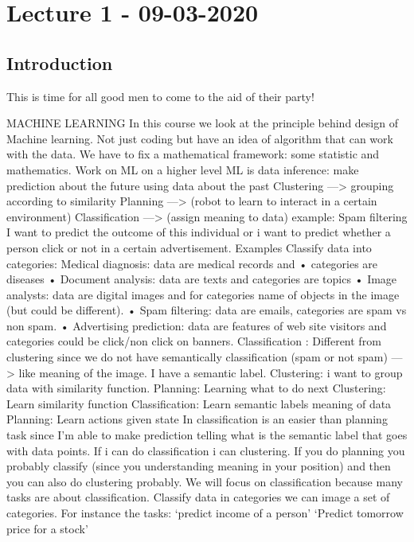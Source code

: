 \documentclass[../main.tex]{subfiles}
\begin{document}
\chapter{Lecture 1 - 09-03-2020}

\section{Introduction}
This is time for all good men to come to the aid of their party!

MACHINE LEARNING
In this course we look at the principle behind design of Machine learning.
Not just coding but have an idea of algorithm that can work with the data.
We have to fix a mathematical framework: some statistic and mathematics.
Work on ML on a higher level
ML is data inference: make prediction about the future using data about the
past
Clustering —> grouping according to similarity
Planning —> (robot to learn to interact in a certain environment)
Classification —> (assign meaning to data) example: Spam filtering
I want to predict the outcome of this individual or i want to predict whether a
person click or not in a certain advertisement.
Examples
Classify data into categories:
Medical diagnosis: data are medical records and • categories are diseases
• Document analysis: data are texts and categories are topics
• Image analysts: data are digital images and for categories name of objects
in the image (but could be different).
• Spam filtering: data are emails, categories are spam vs non spam.
• Advertising prediction: data are features of web site visitors and categories
could be click/non click on banners.
Classification : Different from clustering since we do not have semantically
classification (spam or not spam) —> like meaning of the image.
I have a semantic label.
Clustering: i want to group data with similarity function.
Planning: Learning what to do next
Clustering: Learn similarity function
Classification: Learn semantic labels meaning of data
Planning: Learn actions given state
In classification is an easier than planning task since I’m able to make
prediction telling what is the semantic label that goes with data points.
If i can do classification i can clustering.
If you do planning you probably classify (since you understanding meaning in
your position) and then you can also do clustering probably.
We will focus on classification because many tasks are about classification.
Classify data in categories we can image a set of categories.
For instance the tasks:
‘predict income of a person’
‘Predict tomorrow price for a stock’
\end{document}
